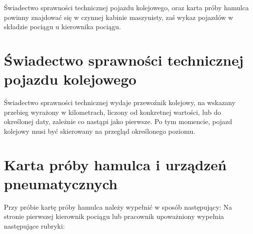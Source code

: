 Świadectwo sprawności technicznej pojazdu kolejowego, oraz karta próby hamulca powinny znajdować się w czynnej kabinie maszynisty, zaś wykaz pojazdów w składzie pociągu u kierownika pociągu.

\section{Świadectwo sprawności technicznej pojazdu kolejowego}
Świadectwo sprawności technicznej wydaje przewoźnik kolejowy, na wskazany przebieg wyrażony w kilometrach, liczony od konkretnej wartości, lub do określonej daty, zależnie co nastąpi jako pierwsze. Po tym momencie, pojazd kolejowy musi być skierowany na przegląd określonego poziomu.

\section{Karta próby hamulca i urządzeń pneumatycznych}
Przy próbie kartę próby hamulca należy wypełnić w sposób następujący:
Na stronie pierwszej kierownik pociągu lub pracownik upoważniony wypełnia następujące rubryki:
